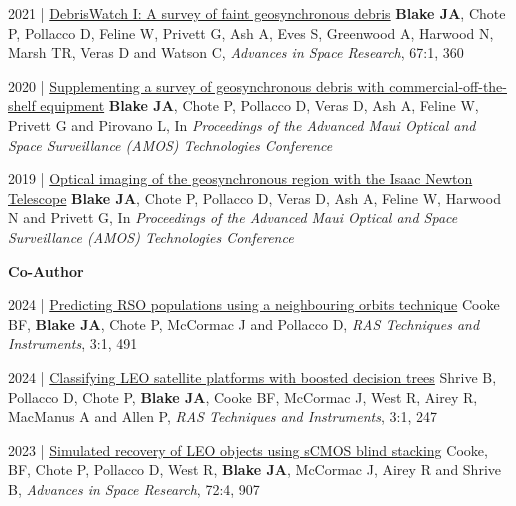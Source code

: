 \documentclass[10pt,a4paper]{altacv}
\begin{document}
\smallskip

\small
2021 | \href{https://www.sciencedirect.com/science/article/abs/pii/S0273117720305664}{DebrisWatch I: A survey of faint geosynchronous debris}
\textbf{Blake JA}, Chote P, Pollacco D, Feline W, Privett G, Ash A, Eves S, Greenwood A, Harwood N, Marsh TR, Veras D and Watson C, \textit{Advances in Space Research}, 67:1, 360

\smallskip

\small
2020 | \href{https://www.researchgate.net/publication/344329639_Supplementing_a_survey_of_geosynchronous_debris_with_commercial-off-the-shelf_equipment}{Supplementing a survey of geosynchronous debris with commercial-off-the-shelf equipment}
\textbf{Blake JA}, Chote P, Pollacco D, Veras D, Ash A, Feline W, Privett G and Pirovano L, In \textit{Proceedings of the Advanced Maui Optical and Space Surveillance (AMOS) Technologies Conference}

\smallskip

\small
2019 | \href{https://www.researchgate.net/publication/338337216_Optical_imaging_of_faint_geosynchronous_debris_with_the_Isaac_Newton_Telescope}{Optical imaging of the geosynchronous region with the Isaac Newton Telescope}
\textbf{Blake JA}, Chote P, Pollacco D, Veras D, Ash A, Feline W, Harwood N and Privett G, In \textit{Proceedings of the Advanced Maui Optical and Space Surveillance (AMOS) Technologies Conference}

\divider

\normalsize \textbf{Co-Author} 

\medskip

\small
2024 | \href{https://academic.oup.com/rasti/article/3/1/491/7733820?login=false}{Predicting RSO populations using a neighbouring orbits technique}
Cooke BF, \textbf{Blake JA}, Chote P, McCormac J and Pollacco D, \textit{RAS Techniques and Instruments}, 3:1, 491

\smallskip

\small
2024 | \href{https://academic.oup.com/rasti/article/3/1/247/7673085?login=false}{Classifying LEO satellite platforms with boosted decision trees}
Shrive B, Pollacco D, Chote P, \textbf{Blake JA}, Cooke BF, McCormac J, West R, Airey R, MacManus A and Allen P, \textit{RAS Techniques and Instruments}, 3:1, 247

\smallskip

\small
2023 | \href{https://www.sciencedirect.com/science/article/pii/S0273117723003502?dgcid=rss_sd_all}{Simulated recovery of LEO objects using sCMOS blind stacking}
Cooke, BF, Chote P, Pollacco D, West R, \textbf{Blake JA}, McCormac J, Airey R and Shrive B, \textit{Advances in Space Research}, 72:4, 907
\end{document}
